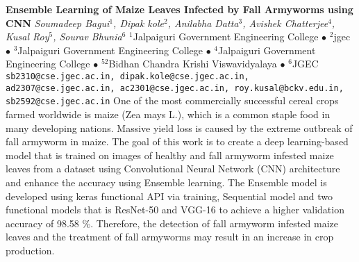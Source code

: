 
    \begin{conf-abstract}[]
        {\textbf{Ensemble Learning of Maize Leaves Infected by Fall Armyworms using CNN}}
        {\textit{Soumadeep Bagui$^{1}$, Dipak kole$^{2}$, Anilabha  Datta$^{3}$, Avishek  Chatterjee$^{4}$, Kusal Roy$^{5}$, Sourav Bhunia$^{6}$}}
        {$^{1}$Jalpaiguri Government Engineering College $\bullet$ $^{2}$jgec $\bullet$ $^{3}$Jalpaiguri Government Engineering College $\bullet$ $^{4}$Jalpaiguri Government Engineering College $\bullet$ $^{5 2}$Bidhan Chandra Krishi Viswavidyalaya $\bullet$ $^{6}$JGEC}
        {\texttt{sb2310@cse.jgec.ac.in, dipak.kole@cse.jgec.ac.in, ad2307@cse.jgec.ac.in, ac2301@cse.jgec.ac.in, roy.kusal@bckv.edu.in, sb2592@cse.jgec.ac.in}}
        {One of the most commercially successful cereal crops farmed worldwide is maize (Zea mays L.), which is a common staple food in many developing nations. Massive yield loss is caused by the extreme outbreak of fall armyworm in maize. The goal of this work is to create a deep learning-based model that is trained on images of healthy and fall armyworm infested maize leaves from a dataset using Convolutional Neural Network (CNN) architecture and enhance the accuracy using Ensemble learning. The Ensemble model is developed using keras functional API via training, Sequential model and two functional models that is ResNet-50 and VGG-16 to achieve a higher validation accuracy of 98.58 \%. Therefore, the detection of fall armyworm infested maize leaves and the treatment of fall armyworms may result in an increase in crop production.}
    \end{conf-abstract}
        
